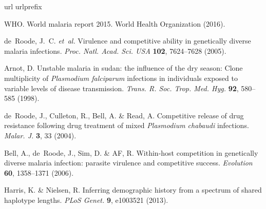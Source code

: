 \documentclass{nature}
\begin{document}

%

\begin{thebibliography}{10}
\expandafter\ifx\csname url\endcsname\relax
  \def\url#1{\texttt{#1}}\fi
\expandafter\ifx\csname urlprefix\endcsname\relax\def\urlprefix{URL }\fi
\providecommand{\bibinfo}[2]{#2}
\providecommand{\eprint}[2][]{\url{#2}}

\bibinfo{author}{WHO}.
\newblock \bibinfo{title}{World malaria report 2015}.
\newblock \bibinfo{howpublished}{World Health Organization}
  (\bibinfo{year}{2016}).

\bibinfo{author}{de~Roode, J.~C.} \emph{et~al.}
\newblock \bibinfo{title}{Virulence and competitive ability in genetically
  diverse malaria infections}.
\newblock \emph{\bibinfo{journal}{Proc. Natl. Acad. Sci. USA}}
  \textbf{\bibinfo{volume}{102}}, \bibinfo{pages}{7624--7628}
  (\bibinfo{year}{2005}).

\bibinfo{author}{Arnot, D.}
\newblock \bibinfo{title}{Unstable malaria in sudan: the influence of the dry
  season: Clone multiplicity of {{\em {P}lasmodium falciparum}} infections in
  individuals exposed to variable levels of disease transmission}.
\newblock \emph{\bibinfo{journal}{Trans. R. Soc. Trop. Med. Hyg.}}
  \textbf{\bibinfo{volume}{92}}, \bibinfo{pages}{580--585}
  (\bibinfo{year}{1998}).

\bibinfo{author}{de~Roode, J.}, \bibinfo{author}{Culleton, R.},
  \bibinfo{author}{Bell, A.} \& \bibinfo{author}{Read, A.}
\newblock \bibinfo{title}{Competitive release of drug resistance following drug
  treatment of mixed {{\em {P}lasmodium chabaudi}} infections}.
\newblock \emph{\bibinfo{journal}{Malar. J.}} \textbf{\bibinfo{volume}{3}},
  \bibinfo{pages}{33} (\bibinfo{year}{2004}).

\bibinfo{author}{Bell, A.}, \bibinfo{author}{de~Roode, J.},
  \bibinfo{author}{Sim, D.} \& \bibinfo{author}{AF, R.}
\newblock \bibinfo{title}{Within-host competition in genetically diverse
  malaria infection: parasite virulence and competitive success.}
\newblock \emph{\bibinfo{journal}{Evolution}} \textbf{\bibinfo{volume}{60}},
  \bibinfo{pages}{1358--1371} (\bibinfo{year}{2006}).

\bibinfo{author}{Harris, K.} \& \bibinfo{author}{Nielsen, R.}
\newblock \bibinfo{title}{Inferring demographic history from a spectrum of
  shared haplotype lengths}.
\newblock \emph{\bibinfo{journal}{PLoS Genet.}} \textbf{\bibinfo{volume}{9}},
  \bibinfo{pages}{e1003521} (\bibinfo{year}{2013}).


\end{thebibliography}
\end{document}
